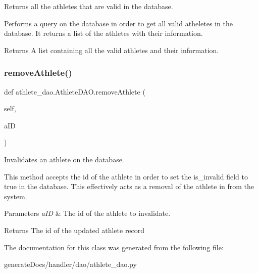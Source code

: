 Returns all the athletes that are valid in the database. 

Performs a query on the database in order to get all valid atheletes in the database. It returns a list of the athletes with their information.

\begin{DoxyReturn}{Returns}
A list containing all the valid athletes and their information. 
\end{DoxyReturn}
\mbox{\label{classathlete__dao_1_1_athlete_d_a_o_aa767760f11043bd9307ad55f0610ea1d}} 
\subsubsection{\texorpdfstring{remove\+Athlete()}{removeAthlete()}}
{\footnotesize\ttfamily def athlete\+\_\+dao.\+Athlete\+D\+A\+O.\+remove\+Athlete (\begin{DoxyParamCaption}\item[{}]{self,  }\item[{}]{a\+ID }\end{DoxyParamCaption})}



Invalidates an athlete on the database. 

This method accepts the id of the athlete in order to set the is\+\_\+invalid field to true in the database. This effectively acts as a removal of the athlete in from the system.


\begin{DoxyParams}{Parameters}
{\em a\+ID} & The id of the athlete to invalidate.\\
\hline
\end{DoxyParams}
\begin{DoxyReturn}{Returns}
The id of the updated athlete record 
\end{DoxyReturn}


The documentation for this class was generated from the following file\+:\begin{DoxyCompactItemize}
\item 
generate\+Docs/handler/dao/athlete\+\_\+dao.\+py\end{DoxyCompactItemize}
